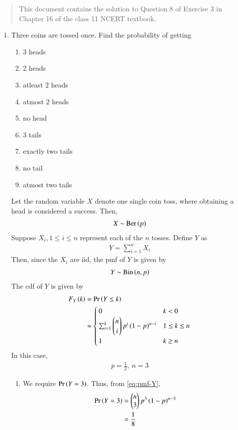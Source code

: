 \documentclass[journal,12pt,twocolumn]{IEEEtran}
\begin{document}
\begin{abstract}
    This document contains the solution to Question 8 of 
    Exercise 3 in Chapter 16 of the class 11 NCERT textbook.
\end{abstract}

\begin{enumerate}
    \item Three coins are tossed once. Find the probability of getting 
    \begin{enumerate}
        \item 3 heads
        \item 2 heads
        \item atleast 2 heads 
        \item atmost 2 heads
        \item no head
        \item 3 tails 
        \item exactly two tails
        \item no tail
        \item atmost two tails
    \end{enumerate}

    \solution Let the random variable $X$ denote one single coin toss, where 
    obtaining a head is considered a success. Then,
    \begin{align}
        X \sim \textrm{Ber}\left(p\right)
        \label{eq:pmf-X}
    \end{align}
    Suppose $X_i, 1\le i\le n$ represent each of the $n$ tosses. Define $Y$ as
    \begin{align}
        Y = \sum_{i=1}^nX_i
        \label{eq:def-Y}
    \end{align}
    Then, since the $X_i$ are iid, the pmf of $Y$ is given by
    \begin{align}
        Y \sim \textrm{Bin}\left(n,p\right)
        \label{eq:pmf-Y}
    \end{align}
    The cdf of $Y$ is given by
    \begin{align}
        F_Y\left(k\right) &= \Pr\left(Y \le k\right) \\
                    &=
        \begin{cases}
            0 & k < 0 \\
            \sum_{i=1}^{k}\begin{pmatrix}n\\i\end{pmatrix}p^i\left(1-p\right)^{n-i} & 1 \le k \le n \\
            1 & k \ge n
        \end{cases}
        \label{eq:cdf-Y}
    \end{align}
    In this case,
    \begin{align}
        p = \frac{1}{2},\ n = 3
    \end{align}
    \begin{enumerate}
        \item We require $\Pr\left(Y=3\right)$. Thus, from \eqref{eq:pmf-Y},
            \begin{align}
                \Pr\left(Y=3\right) &= \begin{pmatrix}n\\3\end{pmatrix}p^3\left(1-p\right)^{n-3} \\
                         &= \frac{1}{8}
                         \label{eq:ans-i}
            \end{align}


\end{enumerate}
\end{enumerate}
\end{document}
